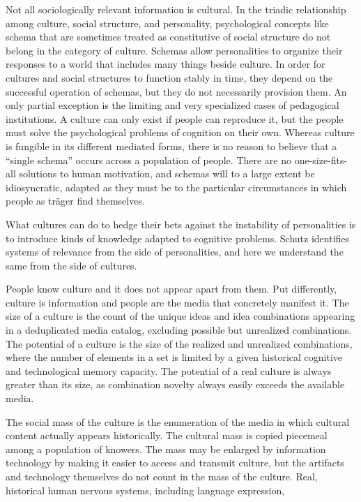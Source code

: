 \documentclass[]{book}
\theoremstyle{definition}
\theoremstyle{definition}
\theoremstyle{definition}
\theoremstyle{remark}
\begin{document}
Not all sociologically relevant information is cultural. In the triadic
relationship among culture, social structure, and personality,
psychological concepts like schema that are sometimes treated as
constitutive of social structure \citep{Sewell1992Theory} do not belong
in the category of culture. Schemas allow personalities to organize
their responses to a world that includes many things beside culture. In
order for cultures and social structures to function stably in time,
they depend on the successful operation of schemas, but they do not
necessarily provision them. An only partial exception is the limiting
and very specialized cases of pedagogical institutions. A culture can
only exist if people can reproduce it, but the people must solve the
psychological problems of cognition on their own. Whereas culture is
fungible in its different mediated forms, there is no reason to believe
that a ``single schema'' occurs across a population of people. There are
no one-size-fits-all solutions to human motivation, and schemas will to
a large extent be idiosyncratic, adapted as they must be to the
particular circumstances in which people as träger find themselves.

What cultures can do to hedge their bets against the instability of
personalities is to introduce kinds of knowledge adapted to cognitive
problems. Schutz identifies systems of relevance from the side of
personalities, and here we understand the same from the side of
cultures.

People know culture and it does not appear apart from them. Put
differently, culture is information and people are the media that
concretely manifest it. The size of a culture is the count of the unique
ideas and idea combinations appearing in a deduplicated media catalog,
excluding possible but unrealized combinations. The potential of a
culture is the size of the realized and unrealized combinations, where
the number of elements in a set is limited by a given historical
cognitive and technological memory capacity. The potential of a real
culture is always greater than its size, as combination novelty always
easily exceeds the available media.

The social mass of the culture is the enumeration of the media in which
cultural content actually appears historically. The cultural mass is
copied piecemeal among a population of knowers. The mass may be enlarged
by information technology by making it easier to access and transmit
culture, but the artifacts and technology themselves do not count in the
mass of the culture. Real, historical human nervous systems, including
language expression,
\end{document}

